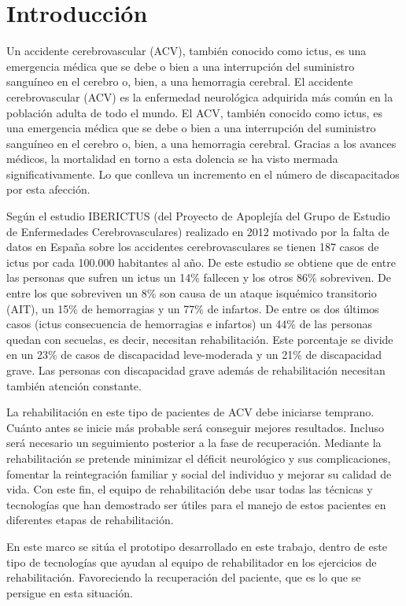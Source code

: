 \chapter{Introducción}

Un accidente cerebrovascular (ACV), también conocido como ictus, es una emergencia médica que se debe o bien a una interrupción del suministro sanguíneo en el cerebro o, bien, a una hemorragia cerebral.
El accidente cerebrovascular (ACV) es la enfermedad neurológica adquirida más común en la población adulta de todo el mundo. El ACV, también conocido como ictus, es una emergencia médica que se debe o bien a una interrupción del suministro sanguíneo en el cerebro o, bien, a una hemorragia cerebral. Gracias a los avances médicos, la mortalidad en torno a esta dolencia se ha visto mermada significativamente. Lo que conlleva un incremento en el número de discapacitados por esta afección. \cite{miradaRehab}

Según el estudio IBERICTUS (del Proyecto de Apoplejía del Grupo de Estudio de Enfermedades Cerebrovasculares) realizado en 2012 motivado por la falta de datos en España sobre los accidentes cerebrovasculares se tienen 187 casos de ictus por cada 100.000 habitantes al año. De este estudio se obtiene que de entre las personas que sufren un ictus un 14\% fallecen y los otros 86\% sobreviven.  De entre los que sobreviven un 8\% son causa de un ataque isquémico transitorio (AIT), un 15\% de hemorragias y un 77\% de infartos. De entre os dos últimos casos (ictus consecuencia de hemorragias e infartos) un 44\% de las personas quedan con secuelas, es decir, necesitan rehabilitación. Este porcentaje se divide en un 23\% de casos de discapacidad leve-moderada y un 21\% de discapacidad grave. Las personas con discapacidad grave además de rehabilitación necesitan también atención constante.  \cite{iberIctus}

La rehabilitación en este tipo de pacientes de ACV debe iniciarse temprano. Cuánto antes se inicie más probable será conseguir mejores resultados. Incluso será necesario un seguimiento posterior a la fase de recuperación. Mediante la rehabilitación se pretende minimizar el déficit neurológico y sus complicaciones, fomentar la reintegración familiar y social del individuo y mejorar su
calidad de vida. Con este fin, el equipo de rehabilitación debe usar todas las técnicas y tecnologías que han demostrado ser útiles para el manejo de estos pacientes en diferentes etapas de rehabilitación. \cite{miradaRehab}

En este marco se sitúa el prototipo desarrollado en este trabajo, dentro de este tipo de tecnologías que ayudan al equipo de rehabilitador en los ejercicios de rehabilitación. Favoreciendo la recuperación del paciente, que es lo que se persigue en esta situación.




